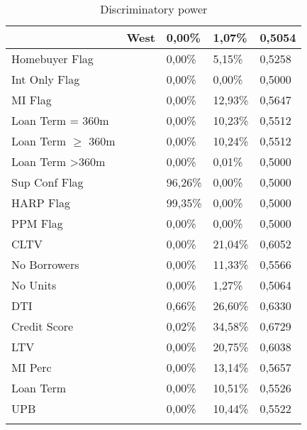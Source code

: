 \begin{longtable}{ l p{5.5cm} l l l }
                            & West                                               & 0,00\%     & 1,07\%  & 0,5054 \\\midrule
Homebuyer Flag              &                                                    & 0,00\%     & 5,15\%  & 0,5258 \\
Int Only Flag               &                                                    & 0,00\%     & 0,00\%  & 0,5000 \\
MI Flag                     &                                                    & 0,00\%     & 12,93\% & 0,5647 \\
Loan Term = 360m            &                                                    & 0,00\%     & 10,23\% & 0,5512 \\
Loan Term $\geq$ 360m       &                                                    & 0,00\%     & 10,24\% & 0,5512 \\
Loan Term \textgreater 360m &                                                    & 0,00\%     & 0,01\%  & 0,5000 \\
Sup Conf Flag               &                                                    & 96,26\%    & 0,00\%  & 0,5000 \\
HARP Flag                   &                                                    & 99,35\%    & 0,00\%  & 0,5000 \\
PPM Flag                    &                                                    & 0,00\%     & 0,00\%  & 0,5000 \\\midrule
CLTV                        &                                                    & 0,00\%     & 21,04\% & 0,6052 \\
No Borrowers                &                                                    & 0,00\%     & 11,33\% & 0,5566 \\
No Units                    &                                                    & 0,00\%     & 1,27\%  & 0,5064 \\
DTI                         &                                                    & 0,66\%     & 26,60\% & 0,6330 \\
Credit Score                &                                                    & 0,02\%     & 34,58\% & 0,6729 \\
LTV                         &                                                    & 0,00\%     & 20,75\% & 0,6038 \\
MI Perc                     &                                                    & 0,00\%     & 13,14\% & 0,5657 \\
Loan Term                   &                                                    & 0,00\%     & 10,51\% & 0,5526 \\
UPB                         &                                                    & 0,00\%     & 10,44\% & 0,5522 \\\bottomrule
    
\caption{Discriminatory power}
\label{tab:re_discr_power}           
\end{longtable}

